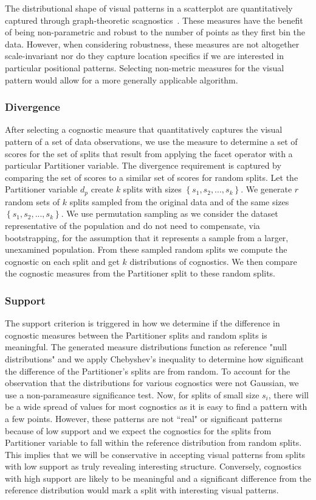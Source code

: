 The distributional shape of visual patterns in a scatterplot are quantitatively captured through graph-theoretic scagnostics~\cite{Wilkinson2005}. These measures have the benefit of being non-parametric and robust to the number of points as they first bin the data. However, when considering robustness, these measures are not altogether scale-invariant nor do they capture location specifics if we are interested in particular positional patterns. Selecting non-metric measures for the visual pattern would allow for a more generally applicable algorithm. 

\subsubsection{Divergence}
After selecting a cognostic measure that quantitatively captures the visual pattern of a set of data observations, we use the measure to determine a set of scores for the set of splits that result from applying the facet operator with a particular Partitioner variable. The divergence requirement is captured by comparing the set of scores to a similar set of scores for random splits. Let the Partitioner variable $d_p$ create $k$ splits with sizes $\left\{ {s_1, s_2,...,s_k}\right\}$. We generate $r$ random sets of $k$ splits sampled from the original data and of the same sizes $\left\{ {s_1, s_2,...,s_k}\right\}$. We use permutation sampling as we consider the dataset representative of the population and do not need to compensate, via bootstrapping, for the assumption that it represents a sample from a larger, unexamined population. From these sampled random splits we compute the cognostic on each split and get $k$ distributions of cognostics. We then compare the cognostic measures from the Partitioner split to these random splits.

\subsubsection{Support}
The support criterion is triggered in how we determine if the difference in cognostic measures between the Partitioner splits and random splits is meaningful. The generated measure distributions function as reference "null distributions" and we apply Chebyshev's inequality to determine how significant the difference of the Partitioner's splits are from random. To account for the observation that the distributions for various cognostics were not Gaussian, we use a non-parameasure significance test. Now, for splits of small size $s_i$, there will be a wide spread of values for most cognostics as it is easy to find a pattern with a few points. However, these patterns are not ``real" or significant patterns because of low support and we expect the cognostics for the splits from Partitioner variable to fall within the reference distribution from random splits. This implies that we will be conservative in accepting visual patterns from splits with low support as truly revealing interesting structure. Conversely, cognostics with high support are likely to be meaningful and a significant difference from the reference distribution would mark a split with interesting visual patterns.

